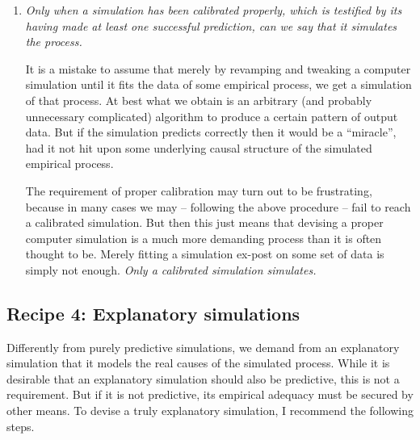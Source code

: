 \begin{enumerate}
\item {\em Only when a simulation has been calibrated properly, which is
    testified by its having made at least one successful prediction, can we
    say that it simulates the process.}

  It is a mistake to assume that merely by revamping and tweaking a computer
  simulation until it fits the data of some empirical process, we get a
  simulation of that process. At best what we obtain is an arbitrary (and
  probably unnecessary complicated) algorithm to produce a certain pattern of
  output data. But if the simulation predicts correctly then it would be a
  ``miracle'', had it not hit upon some underlying causal structure of the
  simulated empirical process.

  The requirement of proper calibration may turn out to be frustrating,
  because in many cases we may -- following the above procedure -- fail to
  reach a calibrated simulation. But then this just means that devising a
  proper computer simulation is a much more demanding process than it is often
  thought to be. Merely fitting a simulation ex-post on some set of data is
  simply not enough. {\em Only a calibrated simulation simulates.}

\end{enumerate}


\subsection{Recipe 4: Explanatory simulations}

Differently from purely predictive simulations, we demand from an explanatory
simulation that it models the real causes of the simulated process. While it
is desirable that an explanatory simulation should also be predictive, this is
not a requirement. But if it is not predictive, its empirical adequacy must be
secured by other means. To devise a truly explanatory simulation, I recommend
the following steps.

